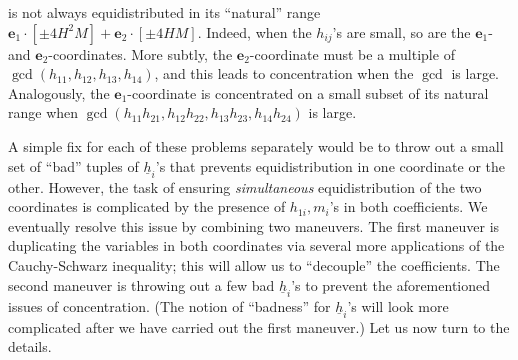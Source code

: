 \documentclass[11pt]{amsart}
\theoremstyle{definition}
\newcommand{\be}{{\mathbf{e}}}
\newcommand{\uh}{{\underline{h}}}
\begin{document}
is not always equidistributed in its ``natural'' range $ \be_1\cdot[\pm 4 H^2 M]+\be_2\cdot[\pm 4 H M]$.  Indeed, when the $h_{ij}$'s are small, so are the $\be_1$- and $\be_2$-coordinates.  More subtly, the $\be_2$-coordinate must be a multiple of $\gcd(h_{11},h_{12},h_{13},h_{14})$, and this leads to concentration when the $\gcd$ is large.  Analogously, the $\be_1$-coordinate is concentrated on a small subset of its natural range when $\gcd(h_{11}h_{21}, h_{12}h_{22},h_{13}h_{23},h_{14}h_{24})$ is large.

A simple fix for each of these problems separately would be to throw out a small set of ``bad'' tuples of $\uh_i$'s that prevents equidistribution in one coordinate or the other. However, the task of ensuring \textit{simultaneous} equidistribution of the two coordinates is complicated by the presence of $h_{1i}, m_i$'s in both coefficients. We eventually resolve this issue by combining two maneuvers. The first maneuver is duplicating the variables in both coordinates via several more applications of the Cauchy-Schwarz inequality; this will allow us to ``decouple'' the coefficients. The second maneuver is throwing out a few bad $\uh_i$'s to prevent the aforementioned issues of concentration.  (The notion of ``badness'' for $\uh_i$'s will look more complicated after we have carried out the first maneuver.)  Let us now turn to the details.



\end{document}
